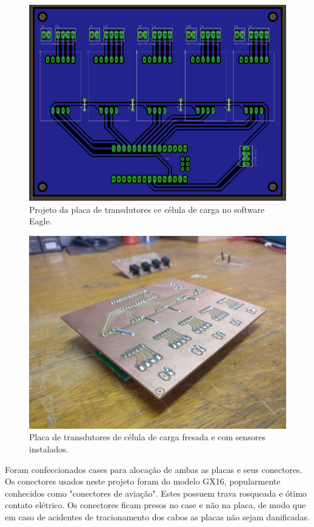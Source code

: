 \begin{figure}[!ht]
    \centering
    \includegraphics[width=.8\linewidth]{figuras/renders/loadcell_board.png}
    \caption{Projeto da placa de transdutores ce célula de carga no software Eagle\cite{autor}.}
    \label{fig:projeto_pcb_celulas}
\end{figure}

\begin{figure}[!ht]
    \centering
    \includegraphics[width=.8\linewidth]{figuras/construcao/pcbs_montadas_3.jpg}
    \caption{Placa de transdutores de célula de carga fresada e com sensores instalados\cite{autor}.}
    \label{fig:placa_pcb_celulas}
\end{figure}

Foram confeccionados cases para alocação de ambas as placas e seus conectores. Os conectores usados neste projeto foram do modelo GX16, popularmente conhecidos como "conectores de aviação". Estes possuem trava rosqueada e ótimo contato elétrico. Os conectores ficam presos no case e não na placa, de modo que em caso de acidentes de tracionamento dos cabos as placas não sejam danificadas.

